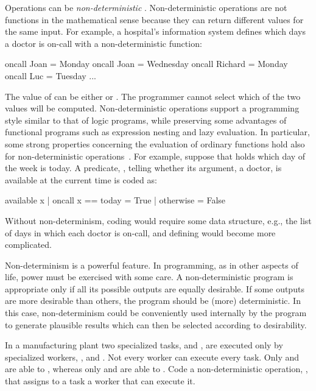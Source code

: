 Operations can be
\emph{non-deterministic}%
.
Non-deterministic operations are not functions in the mathematical sense
because they can return different values for the same input.
For example, a hospital's information system defines which
days a doctor is on-call with a non-deterministic function:
%
\begin{prog}
oncall Joan    = Monday
oncall Joan    = Wednesday
oncall Richard = Monday
oncall Luc     = Tuesday
...
\end{prog}
%
The value of  can be either
 or .
The programmer cannot select which of the two values will be computed.
Non-deterministic operations support a programming style similar
to that of logic programs, while preserving some advantages of functional
programs such as expression nesting and lazy evaluation.
In particular, some strong properties concerning the evaluation
of ordinary functions
hold also for non-deterministic operations~\cite{Antoy97ALP}.
For example, suppose that  holds which day of
the week is today.
A predicate, , telling whether
its argument, a doctor, is available at the current time is coded as:
%
\begin{prog}
available x | oncall x == today = True
            | otherwise         = False
\end{prog}
%
Without non-determinism, coding 
would require some data structure, e.g., 
the list of days in which each doctor is on-call,
and defining  would become more complicated.

Non-determinism is a powerful feature.
In programming,
as in other aspects of life, power must be exercised with some care.
A non-deterministic program is appropriate 
only if all its possible outputs are equally desirable.
If some outputs are more desirable than others,
the program should be (more) deterministic.
In this case,
non-determinism could be conveniently used internally by the program
to generate plausible results
which can then be selected according to desirability.

\begin{exercise}
\label{ex_nondettask}
In a manufacturing plant two specialized tasks,
 and ,
are executed only by specialized workers,
,  and .
Not every worker can execute every task.
Only  and  are able to
, whereas only  and 
are able to .
Code a non-deterministic operation, ,
that assigns to a task a worker that can execute it.
\end{exercise}

